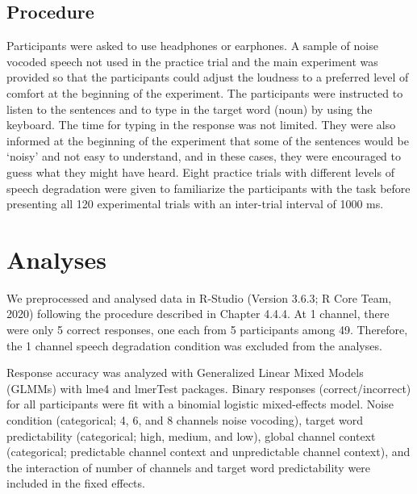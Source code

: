 \documentclass[a4paper, nobind]{templates/ociamthesis}
\begin{document}
\hypertarget{procedure}{%
\subsection{Procedure}\label{procedure}}

Participants were asked to use headphones or earphones.
A sample of noise vocoded speech not used in the practice trial and the main experiment was provided so that the participants could adjust the loudness to a preferred level of comfort at the beginning of the experiment.
The participants were instructed to listen to the sentences and to type in the target word (noun) by using the keyboard.
The time for typing in the response was not limited.
They were also informed at the beginning of the experiment that some of the sentences would be `noisy' and not easy to understand, and in these cases, they were encouraged to guess what they might have heard.
Eight practice trials with different levels of speech degradation were given to familiarize the participants with the task before presenting all 120 experimental trials with an inter-trial interval of 1000 ms.

\hypertarget{analyses}{%
\section{Analyses}\label{analyses}}

We preprocessed and analysed data in R-Studio (Version 3.6.3; R Core Team, 2020) following the procedure described in Chapter 4.4.4.
At 1 channel, there were only 5 correct responses, one each from 5 participants among 49.
Therefore, the 1 channel speech degradation condition was excluded from the analyses.

Response accuracy was analyzed with Generalized Linear Mixed Models (GLMMs) with lme4 \autocite{Bates2015} and lmerTest \autocite{Kuznetsova2017} packages.
Binary responses (correct/incorrect) for all participants were fit with a binomial logistic mixed-effects model\autocite{Jaeger2006,Jaeger2008}.
Noise condition (categorical; 4, 6, and 8 channels noise vocoding), target word predictability (categorical; high, medium, and low), global channel context (categorical; predictable channel context and unpredictable channel context), and the interaction of number of channels and target word predictability were included in the fixed effects.
\end{document}
